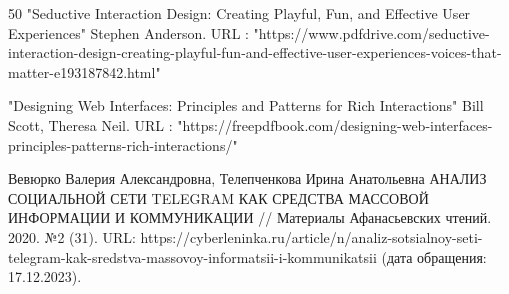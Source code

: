 \documentclass{article}
\begin{document}
\begin{thebibliography} {50}
"Seductive Interaction Design: Creating Playful, Fun, and Effective User Experiences" Stephen Anderson. URL : "https://www.pdfdrive.com/seductive-interaction-design-creating-playful-fun-and-effective-user-experiences-voices-that-matter-e193187842.html"

"Designing Web Interfaces: Principles and Patterns for Rich Interactions" Bill Scott, Theresa Neil. URL : "https://freepdfbook.com/designing-web-interfaces-principles-patterns-rich-interactions/"

Вевюрко Валерия Александровна, Телепченкова Ирина Анатольевна АНАЛИЗ СОЦИАЛЬНОЙ СЕТИ TELEGRAM КАК СРЕДСТВА МАССОВОЙ ИНФОРМАЦИИ И КОММУНИКАЦИИ // Материалы Афанасьевских чтений. 2020. №2 (31). URL: https://cyberleninka.ru/article/n/analiz-sotsialnoy-seti-telegram-kak-sredstva-massovoy-informatsii-i-kommunikatsii (дата обращения: 17.12.2023).


\end{thebibliography}
\end{document}
